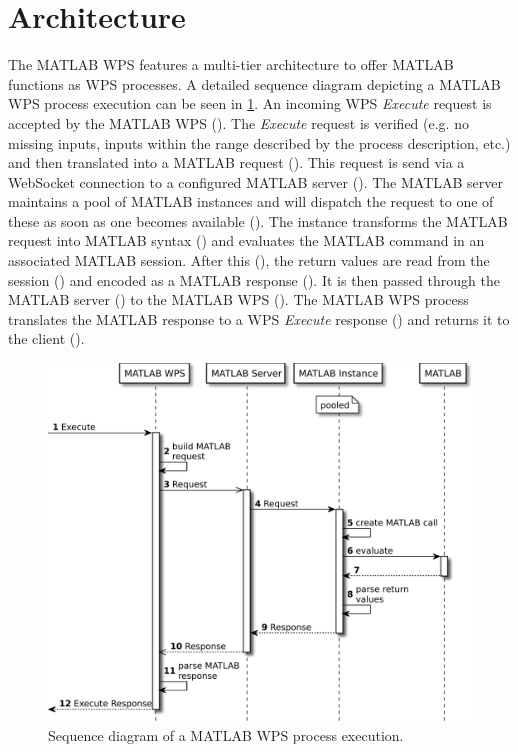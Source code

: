 \section{Architecture}
  The MATLAB WPS features a multi-tier architecture to offer MATLAB functions as \acl{WPS} processes. A detailed sequence diagram depicting a MATLAB WPS process execution can be seen in \cref{fig:sd:mwps}. An incoming WPS \emph{Execute} request is accepted by the MATLAB WPS (). The \emph{Execute} request is verified (e.g. no missing inputs, inputs within the range described by the process description, etc.) and then translated into a MATLAB request (). This request is send via a WebSocket connection to a configured MATLAB server (). The MATLAB server maintains a pool of MATLAB instances and will dispatch the request to one of these as soon as one becomes available (). The instance transforms the MATLAB request into MATLAB syntax () and evaluates the MATLAB command in an associated MATLAB session. After this (), the return values are read from the session () and encoded as a MATLAB response (). It is then passed through the MATLAB server () to the MATLAB WPS (). The MATLAB WPS process translates the MATLAB response to a WPS \emph{Execute} response () and returns it to the client ().

  \begin{figure}[!htb]
    \centering
    \includegraphics[width = 0.6788732394366197\linewidth]{figures/sequence-diagram-mwps.pdf}
    \caption{\label{fig:sd:mwps}Sequence diagram of a MATLAB WPS process execution.}
  \end{figure}

